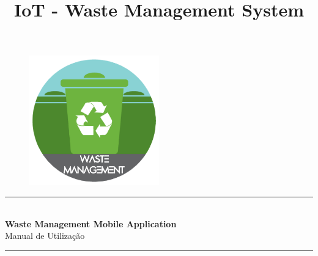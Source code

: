 \documentclass[10pt,a5paper]{article}
\title{IoT - Waste Management System}
\begin{document}
\begin{titlepage}
	
	\newcommand{\HRule}{\rule{\linewidth}{0.5mm}} %
	
	\center %
	
	
	\begin{figure}
		\includegraphics[width=0.5\textwidth]{Images/app_logo}
	\end{figure}
	
	
	\HRule \\[0.2cm]
	{ \huge \bfseries Waste Management Mobile Application}\\
	\vspace*{10px}
	{\Large Manual de Utilização}
	\HRule \\[0.8cm]
	

	\vfill %
	
\end{titlepage}


\cleardoublepage

\tableofcontents


\cleardoublepage
\end{document}
